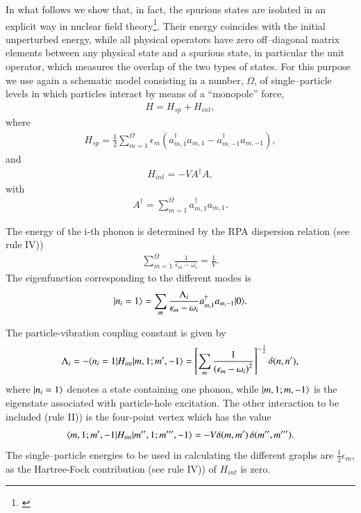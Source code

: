 In what follows we show that, in fact, the spurious states are isolated in an
explicit way in  nuclear field theory\footnote{\cite{Broglia:76}}. Their energy coincides with the
initial unperturbed  energy, while all physical operators have zero off--diagonal
matrix elements between any physical state and a spurious state, in particular
the unit operator, which measures the overlap of the two types of states.
For this purpose we use again a schematic model consisting in a number, $\Omega$,
of single--particle levels in which particles interact by means of a ``monopole''
force,
 \begin{align}\label{eqC1A46} 
H=H_{sp}+H_{int},
 \end{align}
where
 \begin{align}\label{eqC1A47} 
H_{sp}=\frac{1}{2}\sum_{m=1}^\Omega\epsilon_m\left(a^\dagger_{m,1}a_{m,1}-a^\dagger_{m,-1}a_{m,-1}\right),
 \end{align}
and
 \begin{align}\label{eqC1A48} 
H_{int}=-VA^\dagger A,
 \end{align}
with
 \begin{align}\label{eqC1A49} 
 A^\dagger=\sum_{m=1}^\Omega a^\dagger_{m,1}a_{m,1}.
 \end{align}

The energy of the i-th phonon is determined by the RPA dispersion relation (see rule IV)) 
 \begin{align}\label{eqC1A50} 
\sum_{m=1}^{\Omega}\frac{1}{\epsilon_m-\omega_i}=\frac{1}{V}.
 \end{align}
The eigenfunction corresponding to the different modes is 
 \begin{align}\label{eqC1A51} 
|{n_i=1} \rangle=\sum_m\frac{\Lambda_i}{\epsilon_m-\omega_i}a^\dagger_{m,1}a_{m,-1}|{0} \rangle.
 \end{align}


The particle-vibration coupling constant is given by 
 \begin{align}\label{eqC1A52} 
\Lambda_i=-\langle {n_i=1|H_{int}|m,1;m',-1} \rangle=\left[\sum_m\frac{1}{\left(\epsilon_m-\omega_i\right)^2}\right]^{-\frac{1}{2}}\delta(n,n'),
 \end{align} 
where $|{n_i=1} \rangle$ denotes a state containing one phonon, while $|{m,1;m,-1} \rangle$ is the eigenstate associated with particle-hole excitation. The other interaction to be included (rule II)) is the four-point vertex which has the value 
 \begin{align}\label{eqC1A53} 
\langle {m,1;m',-1|H_{int}|m'',1;m''',-1} \rangle=-V\delta(m,m')\,\delta(m'',m''').
 \end{align} 
The single--particle energies to be used in calculating the different graphs are $\frac{1}{2}\epsilon_m$, as the Hartree-Fock contribution (see rule IV)) of $H_{int}$ is zero. 


